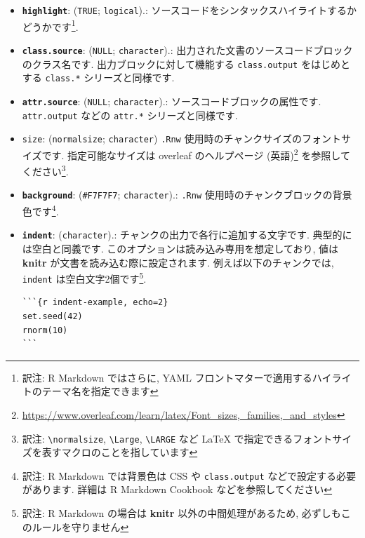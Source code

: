 \documentclass[
  11pt,
  lualatex,
  ja=standard]{bxjsreport}
\renewcommand{\href}[2]{#2\footnote{\url{#1}}}
\begin{document}
\begin{itemize}
\item
  \textbf{\texttt{highlight}}: (\texttt{TRUE}; \texttt{logical}).: ソースコードをシンタックスハイライトするかどうかです\footnote{訳注: R Markdown ではさらに, YAML フロントマターで適用するハイライトのテーマ名を指定できます}.
\item
  \textbf{\texttt{class.source}}: (\texttt{NULL}; \texttt{character}).: 出力された文書のソースコードブロックのクラス名です. 出力ブロックに対して機能する \texttt{class.output} をはじめとする \texttt{class.*} シリーズと同様です.
\item
  \textbf{\texttt{attr.source}}: (\texttt{NULL}; \texttt{character}).: ソースコードブロックの属性です. \texttt{attr.output} などの \texttt{attr.*} シリーズと同様です.
\item
  \texttt{size}: (\texttt{\textquotesingle{}normalsize\textquotesingle{}}; \texttt{character}) \texttt{.Rnw} 使用時のチャンクサイズのフォントサイズです. 指定可能なサイズは \href{https://www.overleaf.com/learn/latex/Font_sizes,_families,_and_styles}{overleaf のヘルプページ (英語)} を参照してください\footnote{訳注: \texttt{\textbackslash{}normalsize}, \texttt{\textbackslash{}Large}, \texttt{\textbackslash{}LARGE} など LaTeX で指定できるフォントサイズを表すマクロのことを指しています}.
\item
  \textbf{\texttt{background}}: (\texttt{\textquotesingle{}\#F7F7F7\textquotesingle{}}; \texttt{character}).: \texttt{.Rnw} 使用時のチャンクブロックの背景色です\footnote{訳注: R Markdown では背景色は CSS や \texttt{class.output} などで設定する必要があります. 詳細は R Markdown Cookbook などを参照してください}.
\item
  \textbf{\texttt{indent}}: (\texttt{character}).: チャンクの出力で各行に追加する文字です. 典型的には空白と同義です. このオプションは読み込み専用を想定しており, 値は \textbf{knitr} が文書を読み込む際に設定されます. 例えば以下のチャンクでは, \texttt{indent} は空白文字2個です\footnote{訳注: R Markdown の場合は \textbf{knitr} 以外の中間処理があるため, 必ずしもこのルールを守りません}.

\begin{verbatim}
```{r indent-example, echo=2}
set.seed(42)
rnorm(10)
```
\end{verbatim}

  \hypertarget{cache-options}{%
}
\end{itemize}
\end{document}
